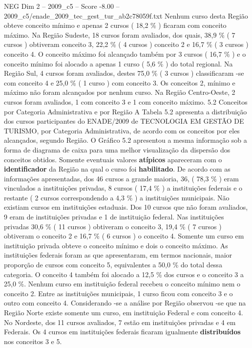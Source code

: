 \begin{textsample}{NEG Dim 2 – 2009\_c5 – Score -8.00 – 2009\_c5/enade\_2009\_tec\_gest\_tur\_ab2c78059f.txt}
Nenhum curso desta Região obteve conceito mínimo e apenas 2 cursos ( 18,2 \% ) ficaram com conceito máximo.
Na Região Sudeste, 18 cursos foram avaliados, dos quais, 38,9 \% ( 7 cursos ) obtiveram conceito 3, 22,2 \% ( 4 cursos ) conceito 2 e 16,7 \% ( 3 cursos ) conceito 4.
O conceito máximo foi alcançado também por 3 cursos ( 16,7 \% ) e o conceito mínimo foi alocado a apenas 1 curso ( 5,6 \% ) do total regional.
Na Região Sul, 4 cursos foram avaliados, destes 75,0 \% ( 3 cursos ) classificaram -se com conceito 4 e 25,0 \% ( 1 curso ) com conceito 3.
Os conceitos 2, mínimo e máximo não foram alcançados por nenhum curso.
Na Região Centro-Oeste, 2 cursos foram avaliados, 1 com conceito 3 e 1 com conceito máximo. 5.2 Conceitos por Categoria Administrativa e por Região A Tabela 5.2 apresenta a distribuição dos cursos participantes do ENADE/2009 de TECNOLOGIA EM GESTÃO DE TURISMO, por Categoria Administrativa, de acordo com os conceitos por eles alcançados, segundo Região.
O Gráfico 5.2 apresentou a mesma informação sob a forma de diagrama de caixa para uma melhor visualização da dispersão dos conceitos obtidos.
Somente eventuais valores \textbf{atípicos} apareceram com o \textbf{identificador} da Região na qual o curso foi \textbf{habilitado}.
De acordo com as informações apresentadas, dos 46 cursos a grande maioria, 36, ( 78,3 \% ) eram vinculados a instituições privadas, 8 cursos ( 17,4 \% ) a instituições federais e o restante ( 2 cursos correspondendo a 4,3 \% ) a instituições municipais.
Não existiam cursos em instituições estaduais.
Dos 10 cursos que não foram avaliados, 9 eram de instituições privadas e 1 de instituição federal.
Nas instituições privadas 30,6 \% ( 11 cursos ) obtiveram o conceito 3, 19,4 \% ( 7 cursos ) obtiveram o conceito 2 e 16,7 \% ( 6 cursos ) o conceito 4.
Somente um curso em instituição privada obteve o conceito mínimo e dois o conceito máximo.
As instituições federais foram as que apresentaram, em termos nacionais, maior proporção de cursos com conceito 5, equivalentes a 50,0 \% do total dessa categoria.
O conceito 4 também foi alocado a 12,5 \% dos cursos e o conceito 3 a 25,0 \%.
Nenhum curso em instituição federal recebeu o conceito mínimo nem o conceito 2.
Entre as instituições municipais, 1 curso ficou com conceito 3 e o outro com conceito 4.
Considerando -se a análise por Região observou -se que na Região Norte existe somente um curso, em instituição Federal e com conceito 4.
No Nordeste, dos 11 cursos avaliados, 7 estão em instituições privadas e 4 em Federais.
Os 4 cursos em instituições federais ficaram igualmente \textbf{distribuídos} nos conceitos 3 e 5.

\end{textsample}
